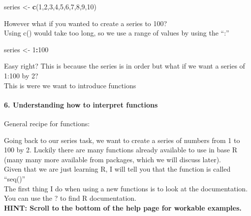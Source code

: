 \documentclass[]{article}
\newenvironment{Shaded}{\begin{snugshade}}{\end{snugshade}}
\newcommand{\KeywordTok}[1]{\textcolor[rgb]{0.13,0.29,0.53}{\textbf{#1}}}
\newcommand{\DecValTok}[1]{\textcolor[rgb]{0.00,0.00,0.81}{#1}}
\newcommand{\StringTok}[1]{\textcolor[rgb]{0.31,0.60,0.02}{#1}}
\newcommand{\CommentTok}[1]{\textcolor[rgb]{0.56,0.35,0.01}{\textit{#1}}}
\newcommand{\OperatorTok}[1]{\textcolor[rgb]{0.81,0.36,0.00}{\textbf{#1}}}
\newcommand{\NormalTok}[1]{#1}
\let\oldparagraph\paragraph
\renewcommand{\paragraph}[1]{\oldparagraph{#1}\mbox{}}
\begin{document}
\begin{Shaded}
\begin{Highlighting}[]
\NormalTok{series <-}\StringTok{ }\KeywordTok{c}\NormalTok{(}\DecValTok{1}\NormalTok{,}\DecValTok{2}\NormalTok{,}\DecValTok{3}\NormalTok{,}\DecValTok{4}\NormalTok{,}\DecValTok{5}\NormalTok{,}\DecValTok{6}\NormalTok{,}\DecValTok{7}\NormalTok{,}\DecValTok{8}\NormalTok{,}\DecValTok{9}\NormalTok{,}\DecValTok{10}\NormalTok{)}
\end{Highlighting}
\end{Shaded}

However what if you wanted to create a series to 100?\\
Using c() would take too long, so we use a range of values by using the
``:''\\

\begin{Shaded}
\begin{Highlighting}[]
\NormalTok{series <-}\StringTok{ }\DecValTok{1}\OperatorTok{:}\DecValTok{100}
\end{Highlighting}
\end{Shaded}

Easy right? This is because the series is in order but what if we want a
series of 1:100 by 2?\\
This is were we want to introduce functions

\paragraph{6. Understanding how to interpret
functions}\label{understanding-how-to-interpret-functions}

General recipe for functions:

\begin{Shaded}
\end{Shaded}

Going back to our series task, we want to create a series of numbers
from 1 to 100 by 2. Luckily there are many functions already available
to use in base R (many many more available from packages, which we will
discuss later).\\[2\baselineskip]Given that we are just learning R, I
will tell you that the function is called ``seq()''\\
The first thing I do when using a new functions is to look at the
documentation. You can use the ? to find R documentation.\\
\textbf{HINT: Scroll to the bottom of the help page for workable
examples.}\\
\end{document}
